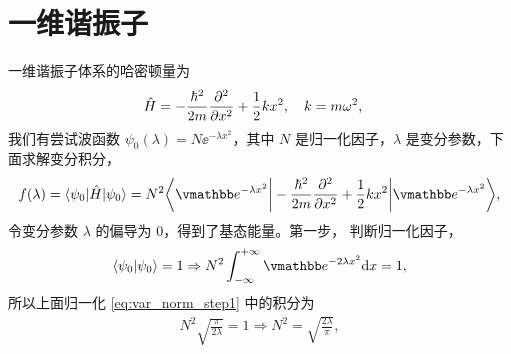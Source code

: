\section{一维谐振子}
一维谐振子体系的哈密顿量为
\begin{align}
    \hat H &= - \frac{\hbar^2}{2m} \pdv[2]x + \frac12 kx^2, \quad k=m\omega^2, 
\end{align}
我们有尝试波函数 $\psi_0(\lambda) = N \ee^{-\lambda x^2}$，其中 $N$ 是归一化因子，$\lambda$ 是变分参数，下面求解变分积分，
\begin{align}
    f(\lambda) = \langle \psi_0 | \hat H | \psi_0 \rangle = N^2 \bigg\langle \ee^{-\lambda x^2} \bigg| -\frac{\hbar^2}{2m} \pdv[2]{x} + \frac12 k x^2 \bigg| \ee^{-\lambda x^2} \bigg\rangle,
\end{align}
令变分参数 $\lambda$ 的偏导为 0，得到了基态能量。第一步，
判断归一化因子，
\begin{align}
    \langle\psi_0 | \psi_0\rangle = 1 \Rightarrow N^2 \intinf \ee^{-2\lambda x^2} \dd x = 1, \label{eq:var_norm_step1}
\end{align}
所以上面归一化 \eqref{eq:var_norm_step1} 中的积分为
\begin{align}
    N^2 \sqrt{\frac{\pi}{2\lambda}} = 1 \Rightarrow N^2 = \sqrt{\frac{2\lambda}{\pi}}, 
\end{align}

